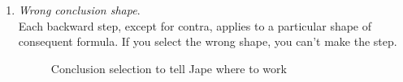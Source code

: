 \documentclass[11pt]{book}
\begin{document}
\begin{enumerate}
\item \emph{Wrong conclusion shape}.\\
Each backward step, except for contra, applies to a particular shape of consequent formula. If you select the wrong shape, you  can't make the step.

\begin{figure}
\centering
{}
\qquad
{}
\caption{Conclusion selection to tell Jape where to work}
\label{fig:concselectiondisambiguates}
\end{figure}


\end{enumerate}
\end{document}
